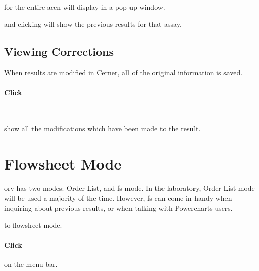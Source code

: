 \clearpage
{} for the entire \gls{accn} will display in a pop-up window.\\


 and clicking  will show the previous results for that assay.

\subsection{Viewing Corrections}

When results are modified in Cerner, all of the original information is saved.

\paragraph{Click} \\


 show all the modifications which have been made to the result.



\section{Flowsheet Mode}
\gls{orv} has two modes: Order List, and \gls{fs} mode. In the laboratory, Order List mode will be used a majority of the time. However, \gls{fs} can come in handy when inquiring about previous results, or when talking with Powercharts users.\\


 to flowsheet mode.

\paragraph{Click}  on the menu bar.
